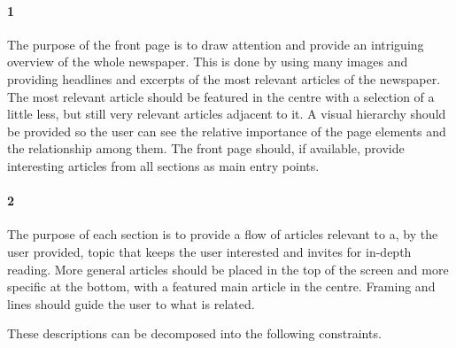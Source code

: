 \paragraph{1} The purpose of the front page is to draw attention and provide an intriguing overview of the whole newspaper. This is done by using many images and providing headlines and excerpts of the most relevant articles of the newspaper. The most relevant article should be featured in the centre with a selection of a little less, but still very relevant articles adjacent to it. A visual hierarchy should be provided so the user can see the relative importance of the page elements and the relationship among them. The front page should, if available, provide interesting articles from all sections as main entry points.

\paragraph{2} The purpose of each section is to provide a flow of articles relevant to a, by the user provided, topic that keeps the user interested and invites for in-depth reading. More general articles should be placed in the top of the screen and more specific at the bottom, with a featured main article in the centre. Framing and lines should guide the user to what is related.

These descriptions can be decomposed into the following constraints.
